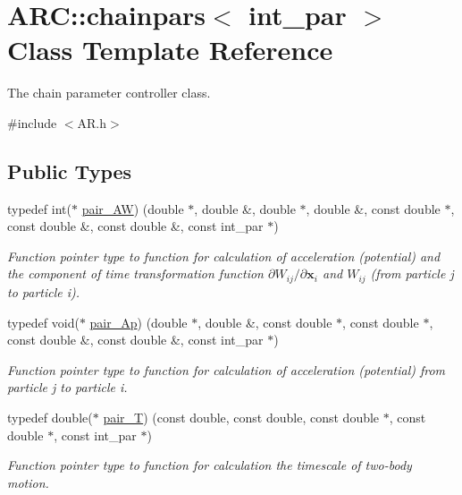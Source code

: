 \hypertarget{classARC_1_1chainpars}{}\section{A\+RC\+:\+:chainpars$<$ int\+\_\+par $>$ Class Template Reference}
\label{classARC_1_1chainpars}


The chain parameter controller class.  




{\ttfamily \#include $<$A\+R.\+h$>$}

\subsection*{Public Types}
\begin{DoxyCompactItemize}
\item 
typedef int($\ast$ \hyperlink{classARC_1_1chainpars_a9558124278a55c0301642e1df63be063}{pair\+\_\+\+AW}) (double $\ast$, double \&, double $\ast$, double \&, const double $\ast$, const double \&, const double \&, const int\+\_\+par $\ast$)
\begin{DoxyCompactList}\small\item\em Function pointer type to function for calculation of acceleration (potential) and the component of time transformation function $\partial W_{ij}/\partial \mathbf{x}_i$ and $W_{ij}$ (from particle j to particle i). \end{DoxyCompactList}\item 
typedef void($\ast$ \hyperlink{classARC_1_1chainpars_a80fcc6e3b5ce69025126bc49d90f233c}{pair\+\_\+\+Ap}) (double $\ast$, double \&, const double $\ast$, const double $\ast$, const double \&, const double \&, const int\+\_\+par $\ast$)
\begin{DoxyCompactList}\small\item\em Function pointer type to function for calculation of acceleration (potential) from particle j to particle i. \end{DoxyCompactList}\item 
typedef double($\ast$ \hyperlink{classARC_1_1chainpars_a860194e916f3ae900e93beedd277fa3c}{pair\+\_\+T}) (const double, const double, const double $\ast$, const double $\ast$, const int\+\_\+par $\ast$)
\begin{DoxyCompactList}\small\item\em Function pointer type to function for calculation the timescale of two-\/body motion. \end{DoxyCompactList}\end{DoxyCompactItemize}
